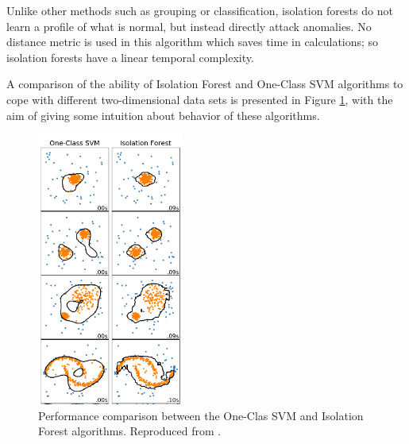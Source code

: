 \vspace{5mm} %

Unlike other methods such as grouping or classification, isolation forests do not learn a profile of what is normal, but instead directly attack anomalies. No distance metric is used in this algorithm which saves time in calculations; so isolation forests have a linear temporal complexity.

\vspace{5mm} %

A comparison of the ability of Isolation Forest and One-Class SVM algorithms to cope with different two-dimensional data sets is presented in Figure \ref{fig:comparacion}, with the aim of giving some intuition about behavior of these algorithms.

\begin{figure}[h!]
  \begin{center}	\includegraphics[width=0.43\textwidth, frame]{imagenes/Cap4/comp_if_ocsvm}
  \caption{Performance comparison between the One-Clas SVM and Isolation Forest algorithms. Reproduced from \protect\cite{Reference73}.} 
  \label{fig:comparacion}
  \end{center}
\end{figure}

